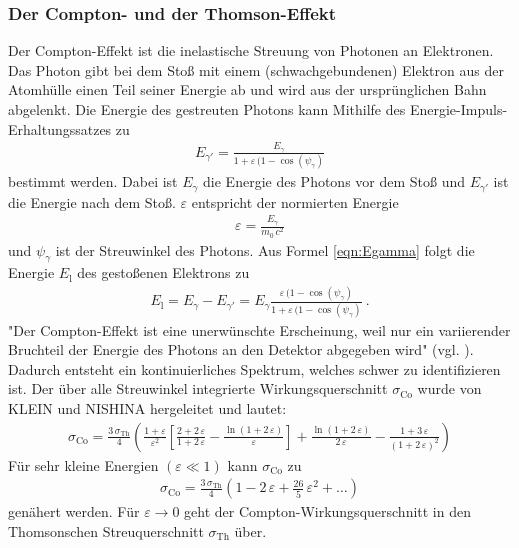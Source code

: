 \subsubsection{Der Compton- und der Thomson-Effekt}
Der Compton-Effekt ist die inelastische Streuung von Photonen an Elektronen. Das Photon gibt bei dem Stoß mit einem (schwachgebundenen) Elektron aus der Atomhülle einen Teil seiner Energie ab und wird aus der ursprünglichen Bahn abgelenkt. Die Energie des gestreuten Photons kann Mithilfe des Energie-Impuls-Erhaltungssatzes zu
\begin{align}
	E_{\gamma'} = \frac{E_{\gamma}}{1 + \varepsilon\,(1-\cos(\psi_{\gamma})}
	\label{eqn:Egamma}
\end{align}
bestimmt werden. Dabei ist $E_{\gamma}$ die Energie des Photons vor dem Stoß und $E_{\gamma'}$ ist die Energie nach dem Stoß. $\varepsilon$ entspricht der normierten Energie
\begin{align}
	\varepsilon = \frac{E_{\gamma}}{m_0\,c^2}
	\label{eqn:normEnergie}
\end{align}
und $\psi_{\gamma}$ ist der Streuwinkel des Photons. Aus Formel \eqref{eqn:Egamma} folgt die Energie $E_\text{l}$ des gestoßenen Elektrons zu
\begin{align}
	E_\text{l} = E_{\gamma} - E_{\gamma'} = E_{\gamma} \frac{\varepsilon\,(1-\cos(\psi_{\gamma})}{1 + \varepsilon\,(1-\cos(\psi_{\gamma})} \ .
	\label{eqn:El}
\end{align}
"Der Compton-Effekt ist eine unerwünschte Erscheinung, weil nur ein variierender Bruchteil der Energie des Photons an den Detektor abgegeben wird" (vgl. \cite[5]{V18}). Dadurch entsteht ein kontinuierliches Spektrum, welches schwer zu identifizieren ist. Der über alle Streuwinkel integrierte Wirkungsquerschnitt $\sigma_\text{Co}$ wurde von KLEIN und NISHINA hergeleitet und lautet:
\begin{align}
	\sigma_\text{Co} = \frac{3\,\sigma_\text{Th}}{4} \left( \frac{1+\varepsilon}{\varepsilon^2} \left[\frac{2+2\,\varepsilon}{1+2\,\varepsilon} - \frac{\ln(1+2\,\varepsilon)}{\varepsilon} \right] + \frac{\ln(1+2\,\varepsilon)}{2\,\varepsilon} - \frac{1+3\,\varepsilon}{(1+2\,\varepsilon)^2} \right)
\end{align}
Für sehr kleine Energien $(\varepsilon \ll 1)$ kann $\sigma_\text{Co}$ zu
\begin{align}
	\sigma_\text{Co} = \frac{3\,\sigma_\text{Th}}{4} \left(1 - 2\,\varepsilon + \frac{26}{5}\,\varepsilon^2 + \dots \right)
\end{align}
genähert werden. Für $\varepsilon \rightarrow 0$ geht der Compton-Wirkungsquerschnitt in den Thomsonschen Streuquerschnitt $\sigma_\text{Th}$ über.
